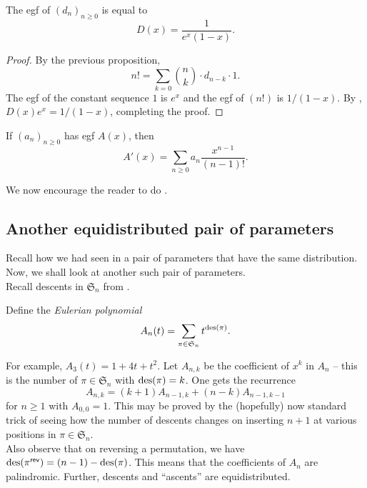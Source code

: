 	\begin{fcor}
		The egf of $(d_n)_{n \ge 0}$ is equal to 
		\[ D(x) = \frac{1}{e^x(1-x)}. \]
	\end{fcor}
	\begin{proof}
		By the previous proposition,
		\[ n! = \sum_{k = 0} \binom{n}{k} \cdot d_{n-k} \cdot 1. \]
		The egf of the constant sequence $1$ is $e^x$ and the egf of $(n!)$ is $1/(1-x)$. By , $D(x) e^x = 1/(1-x)$, completing the proof.
	\end{proof}


	\begin{prop}
		If $(a_n)_{n \ge 0}$ has egf $A(x)$, then
		\[ A'(x) = \sum_{n \ge 0} a_n \frac{x^{n-1}}{(n-1)!}. \]
	\end{prop}

	We now encourage the reader to do .\\

\subsection{Another equidistributed pair of parameters}

	Recall how we had seen in  a pair of parameters that have the same distribution. Now, we shall look at another such pair of parameters.\\
	Recall descents in $\mathfrak{S}_n$ from .\\
	\begin{fdef}
		\label{def: eulerian poly}
		Define the \emph{Eulerian polynomial}
		\begin{equation}
			A_n(t) = \sum_{\pi \in \mathfrak{S}_n} t^{\operatorname{des}(\pi)}. \label{eulerian polynomial}
		\end{equation}
	\end{fdef}
	For example, $A_3(t) = 1+4t+t^2$. Let $A_{n,k}$ be the coefficient of $x^k$ in $A_n$ -- this is the number of $\pi \in \mathfrak{S}_n$ with $\operatorname{des}(\pi) = k$. One gets the recurrence
	\[ A_{n,k} = (k+1)A_{n-1,k} + (n-k)A_{n-1,k-1} \]
	for $n \ge 1$ with $A_{0,0} = 1$. This may be proved by the (hopefully) now standard trick of seeing how the number of descents changes on inserting $n+1$ at various positions in $\pi \in \mathfrak{S}_n$.\\

	Also observe that on reversing a permutation, we have $\operatorname{des}(\pi^\mathsf{rev}) = (n-1) - \operatorname{des}(\pi)$. This means that the coefficients of $A_n$ are palindromic. Further, descents and ``ascents'' are equidistributed.

